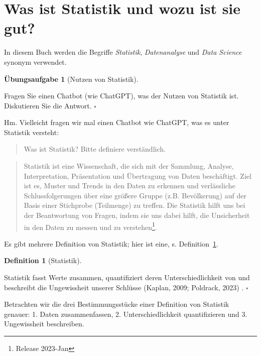 \documentclass[
  letterpaper,
  oneside,
  open=any]{scrbook}
\theoremstyle{definition}
\newtheorem{exercise}{Übungsaufgabe}[chapter]
\theoremstyle{definition}
\theoremstyle{definition}
\newtheorem{definition}{Definition}[chapter]
\theoremstyle{remark}
\begin{document}
\section{Was ist Statistik und wozu ist sie
gut?}\label{was-ist-statistik-und-wozu-ist-sie-gut}

In diesem Buch werden die Begriffe \emph{Statistik}, \emph{Datenanalyse}
und \emph{Data Science} synonym verwendet.

\begin{exercise}[Nutzen von
Statistik]\protect\hypertarget{exr-nutzen-statistik}{}\label{exr-nutzen-statistik}

Fragen Sie einen Chatbot (wie ChatGPT), was der Nutzen von Statistik
ist. Diskutieren Sie die Antwort. \(\square\)

\end{exercise}

Hm. Vielleicht fragen wir mal einen Chatbot wie ChatGPT, was es unter
Statistik versteht:

\begin{quote}
{} Was ist Statistik? Bitte definiere verständlich.
\end{quote}

\begin{quote}
{} Statistik ist eine Wissenschaft, die sich mit der
Sammlung, Analyse, Interpretation, Präsentation und Übertragung von
Daten beschäftigt. Ziel ist es, Muster und Trends in den Daten zu
erkennen und verlässliche Schlussfolgerungen über eine größere Gruppe
(z.B. Bevölkerung) auf der Basis einer Stichprobe (Teilmenge) zu
treffen. Die Statistik hilft uns bei der Beantwortung von Fragen, indem
sie uns dabei hilft, die Unsicherheit in den Daten zu messen und zu
verstehen\footnote{Release 2023-Jan}.
\end{quote}

Es gibt mehrere Definition von Statistik; hier ist eine, s.
Definition~\ref{def-statistik}.

\begin{definition}[Statistik]\protect\hypertarget{def-statistik}{}\label{def-statistik}

Statistik fasst Werte zusammen, quantifiziert deren Unterschiedlichkeit
von und beschreibt die Ungewissheit unserer Schlüsse (Kaplan, 2009;
Poldrack, 2023) . \(\square\)

\end{definition}

Betrachten wir die drei Bestimmungsstücke einer Definition von Statistik
genauer: 1. Daten zusammenfassen, 2. Unterschiedlichkeit quantifizieren
und 3. Ungewissheit beschreiben.
\end{document}

